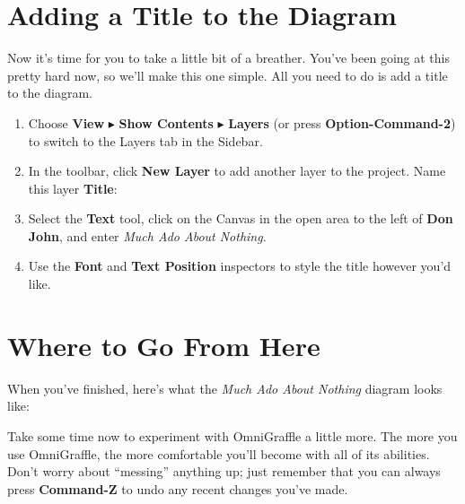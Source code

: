 \documentclass[../main.tex]{subfiles}
\begin{document}
\section{Adding a Title to the Diagram}

Now it's time for you to take a little bit of a breather. You've been going at this pretty hard
now, so we'll make this one simple. All you need to do is add a title to the diagram.

\begin{enumerate}
  \item Choose \textbf{View} $\blacktriangleright$ \textbf{Show Contents} $\blacktriangleright$
    \textbf{Layers} (or press \textbf{Option-Command-2}) to switch to the Layers tab in the
    Sidebar.
  \item In the toolbar, click \textbf{New Layer} to add another layer to the project. Name this
    layer \textbf{Title}:

  \item Select the \textbf{Text} tool, click on the Canvas in the open area to the left of
    \textbf{Don John}, and enter \textit{Much Ado About Nothing}.
  \item Use the \textbf{Font} and \textbf{Text Position} inspectors to style the title however
    you'd like.

\end{enumerate}

\section{Where to Go From Here}

When you've finished, here's what the \textit{Much Ado About Nothing} diagram looks like:


Take some time now to experiment with OmniGraffle a little more. The more you use OmniGraffle,
the more comfortable you'll become with all of its abilities. Don't worry about ``messing''
anything up; just remember that you can always press \textbf{Command-Z} to undo any recent
changes you've made.
\end{document}
